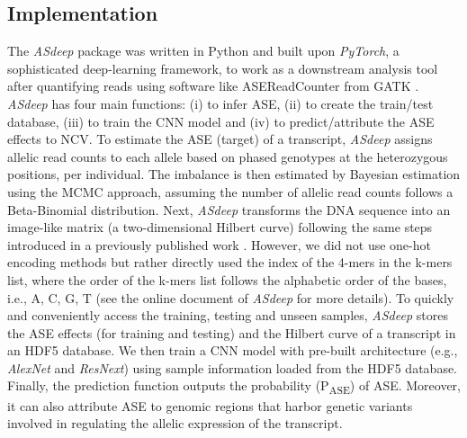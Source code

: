 \documentclass{book}
\begin{document}
\begin{refsection}
\section*{Implementation}
The \textit{ASdeep} package was written in Python and built upon \textit{PyTorch}, a sophisticated deep-learning framework, to work as a downstream analysis tool after quantifying reads using software like ASEReadCounter from GATK \cite{Castel2015Tools}.
\textit{ASdeep} has four main functions: (i) to infer ASE, (ii) to create the train/test database, (iii) to train the CNN model and (iv) to predict/attribute the ASE effects to NCV.
To estimate the ASE (target) of a transcript, \textit{ASdeep} assigns allelic read counts to each allele based on phased genotypes at the heterozygous positions, per individual.
The imbalance is then estimated by Bayesian estimation using the MCMC approach, assuming the number of allelic read counts follows a Beta-Binomial distribution.
Next, \textit{ASdeep} transforms the DNA sequence into an image-like matrix (a two-dimensional Hilbert curve) following the same steps introduced in a previously published work \cite{Image2018Yin}.
However, we did not use one-hot encoding methods but rather directly used the index of the 4-mers in the k-mers list, where the order of the k-mers list follows the alphabetic order of the bases, i.e., A, C, G, T (see the online document of \textit{ASdeep} for more details).
To quickly and conveniently access the training, testing and unseen samples, \textit{ASdeep} stores the ASE effects (for training and testing) and the Hilbert curve of a transcript in an HDF5 database.
We then train a CNN model with pre-built architecture (e.g., \textit{AlexNet} and \textit{ResNext}) using sample information loaded from the HDF5 database.
Finally, the prediction function outputs the probability (P\textsubscript{ASE}) of ASE.
Moreover, it can also attribute ASE to genomic regions that harbor genetic variants involved in regulating the allelic expression of the transcript.


\end{refsection}
\end{document}
